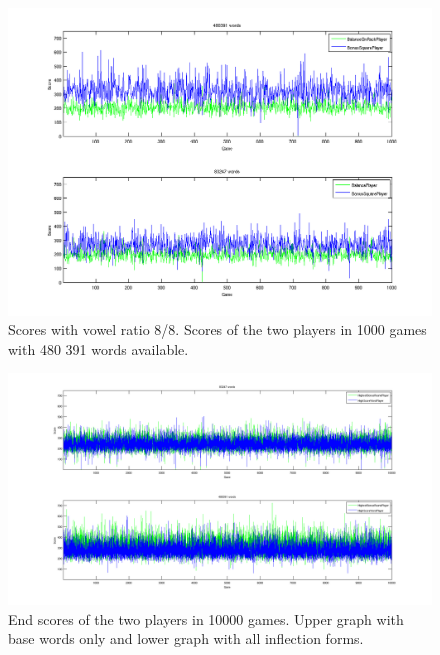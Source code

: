 \documentclass[a4paper, 12pt]{report}
\begin{document}
\begin{figure}[h]
\centering
\includegraphics[scale=0.5]{BonusBalance8vow_bothDict}
\caption {Scores with vowel ratio 8/8. Scores of the two players in 1000 games with 480 391 words available.}
\label{fig:bonusBalanceLargeDict}
\end{figure}

\begin{figure}
\centering
\includegraphics[scale=0.3]{Highest_Bonus_Round_vs_High_Score_Word_10000}
\caption {End scores of the two players in 10000 games. Upper graph with base words only and lower graph with all inflection forms.}
\label{fig:bs+hsw+totalscores}
\end{figure}
\end{document}
